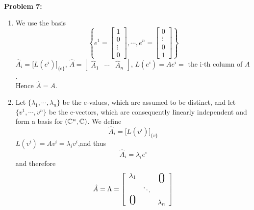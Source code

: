 \documentclass[letterpaper]{article}
\begin{document}
\noindent \textbf{Problem 7:}
\begin{enumerate}
\setlength{\itemsep}{.1in}
\renewcommand{\labelenumi}{(\alph{enumi})}
\item We use the basis
$$\left\{e^1=\begin{bmatrix} 1\\ 0 \\ \vdots \\0 \end{bmatrix},\cdots,e^n = \begin{bmatrix}0\\ \vdots \\ 0 \\1 \end{bmatrix}\right\}$$
$\hat{A}_i=\big[L(e^i)\big]_{\{e\}}$, $\hat{A}=\left[\begin{array}{c|c|c} \hat{A}_1 & \cdots & \hat{A}_n\end{array}\right]$, $L(e^i)=Ae^i=$ the i-th column of $A$. \\
Hence $\boxed{\hat{A}=A}$.

\item Let $\{\lambda_1,\cdots,\lambda_n\}$ be the e-values, which are assumed to be distinct, and let $\{v^1,\cdots,v^n\}$ be the e-vectors, which are consequently linearly independent and form a basis for $({\mathbb C}^n,\mathbb C)$. We define
    $$\hat{A}_i=\big[L(v^i)\big]_{\{v\}}$$
$L(v^i)=Av^i=\lambda_i v^i$,and thus
    $$\hat{A}_i=\lambda_i e^i$$
and therefore
$$\hat{A}=\Lambda =\left[\begin{array}{ccc} \lambda_1 & &\raisebox{-1.7ex}[0pt]{\huge0} \\
                                   & \ddots & \\
                                  \text{\huge0} & & \lambda_n
                                  \end{array}\right]$$
\end{enumerate}

\bigskip
\end{document}
